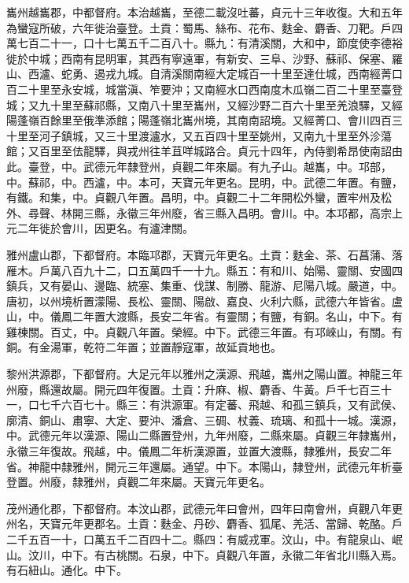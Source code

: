 \begin{pinyinscope}
 巂州越巂郡，中都督府。本治越巂，至德二載沒吐蕃，貞元十三年收復。大和五年為蠻寇所破，六年徙治臺登。土貢：蜀馬、絲布、花布、麩金、麝香、刀靶。戶四萬七百二十一，口十七萬五千二百八十。縣九：有清溪關，大和中，節度使李德裕徙於中城；西南有昆明軍，其西有寧遠軍，有新安、三阜、沙野、蘇祁、保塞、羅山、西瀘、蛇勇、遏戎九城。自清溪關南經大定城百一十里至達仕城，西南經菁口百二十里至永安城，城當滇、笮要沖；又南經水口西南度木瓜嶺二百二十里至臺登城；又九十里至蘇祁縣，又南八十里至巂州，又經沙野二百六十里至羌浪驛，又經陽蓬嶺百餘里至俄準添館；陽蓬嶺北巂州境，其南南詔境。又經菁口、會川四百三十里至河子鎮城，又三十里渡瀘水，又五百四十里至姚州，又南九十里至外沴蕩館；又百里至佉龍驛，與戎州往羊苴咩城路合。貞元十四年，內侍劉希昂使南詔由此。臺登，中。武德元年隸登州，貞觀二年來屬。有九子山。越巂，中。邛部，中。蘇祁，中。西瀘，中。本可，天寶元年更名。昆明，中。武德二年置。有鹽，有鐵。和集，中。貞觀八年置。昌明，中。貞觀二十二年開松外蠻，置牢州及松外、尋聲、林開三縣，永徽三年州廢，省三縣入昌明。會川。中。本邛都，高宗上元二年徙於會川，因更名。有瀘津關。



 雅州盧山郡，下都督府。本臨邛郡，天寶元年更名。土貢：麩金、茶、石菖蒲、落雁木。戶萬八百九十二，口五萬四千一十九。縣五：有和川、始陽、靈關、安國四鎮兵，又有晏山、邊臨、統塞、集重、伐謀、制勝、龍游、尼陽八城。嚴道，中。唐初，以州境析置濛陽、長松、靈關、陽啟、嘉良、火利六縣，武德六年皆省。盧山，中。儀鳳二年置大渡縣，長安二年省。有靈關；有鹽，有銅。名山，中下。有雞棟關。百丈，中。貞觀八年置。榮經。中下。武德三年置。有邛崍山，有關。有銅。有金湯軍，乾符二年置；並置靜寇軍，故延貢地也。



 黎州洪源郡，下都督府。大足元年以雅州之漢源、飛越，巂州之陽山置。神龍三年州廢，縣還故屬。開元四年復置。土貢：升麻、椒、麝香、牛黃。戶千七百三十一，口七千六百七十。縣三：有洪源軍。有定蕃、飛越、和孤三鎮兵，又有武侯、廓清、銅山、肅寧、大定、要沖、潘倉、三碉、杖義、琉璃、和孤十一城。漢源，中。武德元年以漢源、陽山二縣置登州，九年州廢，二縣來屬。貞觀三年隸巂州，永徽三年復故。飛越，中。儀鳳二年析漢源置，並置大渡縣，隸雅州，長安二年省。神龍中隸雅州，開元三年還屬。通望。中下。本陽山，隸登州，武德元年析臺登置。州廢，隸雅州，貞觀二年來屬。天寶元年更名。



 茂州通化郡，下都督府。本汶山郡，武德元年曰會州，四年曰南會州，貞觀八年更州名，天寶元年更郡名。土貢：麩金、丹砂、麝香、狐尾、羌活、當歸、乾酪。戶二千五百一十，口萬五千二百四十二。縣四：有威戎軍。汶山，中。有龍泉山、岷山。汶川，中下。有古桃關。石泉，中下。貞觀八年置，永徽二年省北川縣入焉。有石紐山。通化。中下。




\end{pinyinscope}
